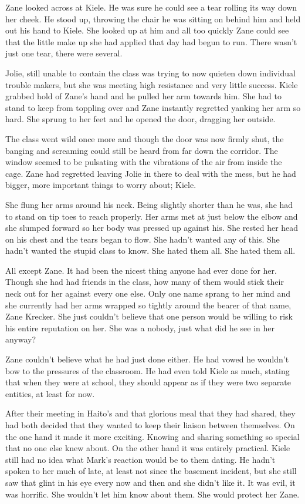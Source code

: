 Zane looked across at Kiele.  He was sure he could see a tear rolling its way down her cheek.  He stood up, throwing the chair he was sitting on behind him and held out his hand to Kiele.  She looked up at him and all too quickly Zane could see that the little make up she had applied that day had begun to run.  There wasn't just one tear, there were several.  

Jolie, still unable to contain the class was trying to now quieten down individual trouble makers, but she was meeting high resistance and very little success.  Kiele grabbed hold of Zane's hand and he pulled her arm towards him.  She had to stand to keep from toppling over and Zane instantly regretted yanking her arm so hard.  She sprung to her feet and he opened the door, dragging her outside.  

The class went wild once more and though the door was now firmly shut, the banging and screaming could still be heard from far down the corridor.  The window seemed to be pulsating with the vibrations of the air from inside the cage.  Zane had regretted leaving Jolie in there to deal with the mess, but he had bigger, more important things to worry about; Kiele.  

She flung her arms around his neck.  Being slightly shorter than he was, she had to stand on tip toes to reach properly.  Her arms met at just below the elbow and she slumped forward so her body was pressed up against his.  She rested her head on his chest and the tears began to flow.  She hadn't wanted any of this.  She hadn't wanted the stupid class to know.  She hated them all.  She hated them all.

All except Zane.  It had been the nicest thing anyone had ever done for her.  Though she had had friends in the class, how many of them would stick their neck out for her against every one else.  Only one name sprang to her mind and she currently had her arms wrapped so tightly around the bearer of that name, Zane Krecker.  She just couldn't believe that one person would be willing to risk his entire reputation on her.  She was a nobody, just what did he see in her anyway?

Zane couldn't believe what he had just done either.  He had vowed he wouldn't bow to the pressures of the classroom.  He had even told Kiele as much, stating that when they were at school, they should appear as if they were two separate entities, at least for now.  

After their meeting in Haito's and that glorious meal that they had shared, they had both decided that they wanted to keep their liaison between themselves.  On the one hand it made it more exciting.  Knowing and sharing something so special that no one else knew about.  On the other hand it was entirely practical.  Kiele still had no idea what Mark's reaction would be to them dating.  He hadn't spoken to her much of late, at least not since the basement incident, but she still saw that glint in his eye every now and then and she didn't like it.  It was evil, it was horrific.  She wouldn't let him know about them.  She would protect her Zane.

